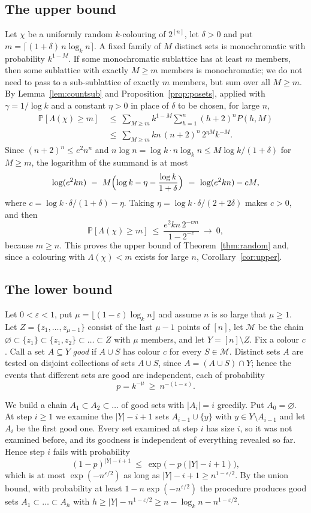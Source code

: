 \documentclass[11pt,reqno]{amsart}
\numberwithin{equation}{section}
\theoremstyle{plain}
\theoremstyle{definition}
\theoremstyle{remark}
\newcommand{\cM}{\mathcal{M}}
\renewcommand{\Pr}{\mathbb{P}}
\newcommand{\eps}{\varepsilon}
\begin{document}
\subsection{The upper bound}
Let $\chi$ be a uniformly random $k$-colouring of $2^{[n]}$, let $\delta>0$
and put $m=\lceil(1+\delta)\,n\log_kn\rceil$. A fixed family of $M$
distinct sets is monochromatic with probability $k^{1-M}$. If some
monochromatic sublattice has at least $m$ members, then some sublattice
with exactly $M\ge m$ members is monochromatic; we do not need to pass to a
sub-sublattice of exactly $m$ members, but sum over all $M\ge m$. By
Lemma~\ref{lem:countsub} and Proposition~\ref{prop:posets}, applied with
$\gamma=1/\log k$ and a constant $\eta>0$ in place of $\delta$ to be chosen,
for large $n$,
\begin{align*}
\Pr[\Lambda(\chi)\ge m]\ &\le\ \sum_{M\ge m}k^{1-M}\sum_{h=1}^{n}(h+2)^{n}
P(h,M)\\
&\le\ \sum_{M\ge m}kn\,(n+2)^{n}\,2^{\eta M}k^{-M}.
\end{align*}
Since $(n+2)^{n}\le e^{2}n^{n}$ and $n\log n=\log k\cdot n\log_kn\le
M\log k/(1+\delta)$ for $M\ge m$, the logarithm of the summand is at most
\[
\log(e^{2}kn)\ -\ M\Bigl(\log k-\eta-\frac{\log k}{1+\delta}\Bigr)
\ =\ \log(e^{2}kn)-cM,
\]
where $c=\log k\cdot\delta/(1+\delta)-\eta$. Taking
$\eta=\log k\cdot\delta/(2+2\delta)$ makes $c>0$, and then
\[
\Pr[\Lambda(\chi)\ge m]\ \le\ \frac{e^{2}kn\,2^{-cm}}{1-2^{-c}}\
\longrightarrow\ 0,
\]
because $m\ge n$. This proves the upper bound of Theorem~\ref{thm:random}
and, since a colouring with $\Lambda(\chi)<m$ exists for large $n$,
Corollary~\ref{cor:upper}.

\subsection{The lower bound}
Let $0<\eps<1$, put $\mu=\lfloor(1-\eps)\log_kn\rfloor$ and assume $n$ is
so large that $\mu\ge1$. Let $Z=\{z_1,\dots,z_{\mu-1}\}$ consist of the
last $\mu-1$ points of $[n]$, let $\cM$ be the chain
$\varnothing\subset\{z_1\}\subset\{z_1,z_2\}\subset\dots\subset Z$ with
$\mu$ members, and let $Y=[n]\setminus Z$. Fix a colour $c$. Call a set
$A\subseteq Y$ \emph{good} if $A\cup S$ has colour $c$ for every
$S\in\cM$. Distinct sets $A$ are tested on disjoint collections of sets
$A\cup S$, since $A=(A\cup S)\cap Y$; hence the events that different sets
are good are independent, each of probability
\[
p=k^{-\mu}\ \ge\ n^{-(1-\eps)} .
\]

We build a chain $A_1\subset A_2\subset\dots$ of good sets with
$|A_i|=i$ greedily. Put $A_0=\varnothing$. At step $i\ge1$ we examine the
$|Y|-i+1$ sets $A_{i-1}\cup\{y\}$ with $y\in Y\setminus A_{i-1}$ and let
$A_i$ be the first good one. Every set examined at step $i$ has size $i$,
so it was not examined before, and its goodness is independent of
everything revealed so far. Hence step $i$ fails with probability
\[
(1-p)^{|Y|-i+1}\ \le\ \exp\bigl(-p(|Y|-i+1)\bigr),
\]
which is at most $\exp(-n^{\eps/2})$ as long as $|Y|-i+1\ge n^{1-\eps/2}$.
By the union bound, with probability at least $1-n\exp(-n^{\eps/2})$ the
procedure produces good sets $A_1\subset\dots\subset A_h$ with
$h\ge|Y|-n^{1-\eps/2}\ge n-\log_kn-n^{1-\eps/2}$.
\end{document}
